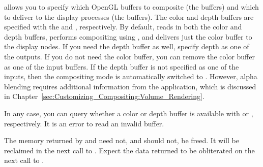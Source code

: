  allows you to specify which OpenGL buffers
to composite (the  buffers) and which to deliver to the
display processes (the  buffers).  The
color and depth buffers are specified with the
 and ,
respectively.  By default, \IceT reads in both the color and depth buffers,
performs compositing using , and
delivers just the color buffer to the display nodes.  If you need the depth
buffer as well, specify depth as one of the outputs.  If you do not need
the color buffer, you can remove the color buffer as one of the input
buffers.  If the depth buffer is not specified as one of the inputs, then
the compositing mode is automatically switched to
.  However, alpha blending
requires additional information from the application, which is discussed
in Chapter~\ref{sec:Customizing_Compositing:Volume_Rendering}.

In any case, you can query whether a color or depth buffer is available
with  or
, respectively.  It is an error to read
an invalid buffer.

The memory returned by \icetGetColorBuffer and \icetGetDepthBuffer need
not, and should not, be freed.  It will be reclaimed in the next call to
.  Expect the data returned to be obliterated on the
next call to .
